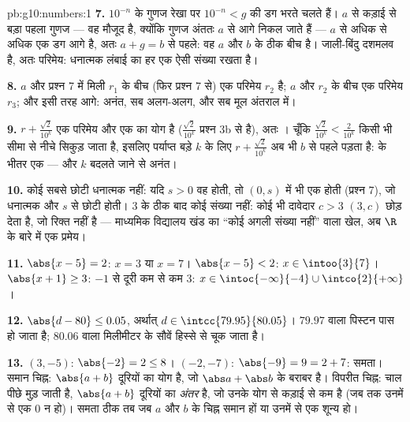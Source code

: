 \begin{solution}{pb:g10:numbers:1}
\textbf{7.} $10^{-n}$ के गुणज रेखा पर $10^{-n} < g$ की डग भरते चलते हैं। $a$ से कड़ाई
से बड़ा पहला गुणज --- वह मौजूद है, क्योंकि गुणज अंततः $a$ से आगे निकल
जाते हैं --- $a$ से अधिक से अधिक एक डग आगे है, अतः $a + g = b$ से पहले: वह $a$
और $b$ के ठीक बीच है। जाली-बिंदु दशमलव है, अतः परिमेय: धनात्मक लंबाई का
हर  एक ऐसी संख्या रखता है।

\textbf{8.} $a$ और प्रश्न 7 में मिली  $r_1$ के बीच (फिर
प्रश्न 7 से) एक परिमेय $r_2$ है; $a$ और $r_2$ के बीच एक परिमेय $r_3$; और
इसी तरह आगे: अनंत, सब अलग-अलग, और सब मूल अंतराल में।

\textbf{9.} $r + \frac{\sqrt2}{10^k}$ एक परिमेय और एक  का योग है ($\frac{\sqrt2}{10^k}$ प्रश्न 3b
से  है), अतः । चूँकि $\frac{\sqrt2}{10^k} < \frac{2}{10^k}$ किसी भी सीमा से नीचे सिकुड़ जाता
है, इसलिए पर्याप्त बड़े $k$ के लिए $r + \frac{\sqrt2}{10^k}$ अब भी $b$ से पहले पड़ता है:
 के भीतर एक  --- और $k$ बदलते जाने से अनंत।

\textbf{10.} कोई सबसे छोटी धनात्मक  नहीं: यदि $s > 0$ वह होती,
तो  $(0, s)$ में भी एक  होती (प्रश्न 7), जो धनात्मक और
$s$ से छोटी होती। $3$ के ठीक बाद कोई संख्या नहीं: कोई भी दावेदार $c > 3$
 $(3, c)$ छोड़ देता है, जो रिक्त नहीं है --- माध्यमिक विद्यालय खंड का
``कोई अगली संख्या नहीं'' वाला खेल, अब $\R$ के बारे में एक प्रमेय।

\textbf{11.} $\abs{x - 5} = 2$: $x = 3$ या $x = 7$।
$\abs{x - 5} < 2$: $x \in \intoo{3}{7}$।
$\abs{x + 1} \geq 3$: $-1$ से दूरी कम से कम $3$: $x \in \intoc{-\infty}{-4} \cup \intco{2}{+\infty}$।

\textbf{12.} $\abs{d - 80} \leq 0.05$, अर्थात् $d \in \intcc{79.95}{80.05}$। $79.97$ वाला पिस्टन पास हो जाता है; $80.06$
वाला मिलीमीटर के सौवें हिस्से से चूक जाता है।

\textbf{13.} $(3, -5)$: $\abs{-2} = 2 \leq 8$। $(-2, -7)$: $\abs{-9} = 9 = 2 + 7$: समता। समान चिह्न: $\abs{a + b}$ दूरियों का
योग है, जो $\abs a + \abs b$ के बराबर है। विपरीत चिह्न: चाल पीछे मुड़ जाती है, $\abs{a + b}$
दूरियों का \emph{अंतर} है, जो उनके योग से कड़ाई से कम है (जब तक उनमें से एक
$0$ न हो)। समता ठीक तब जब $a$ और $b$ के चिह्न समान हों या उनमें से एक
शून्य हो।


\end{solution}
